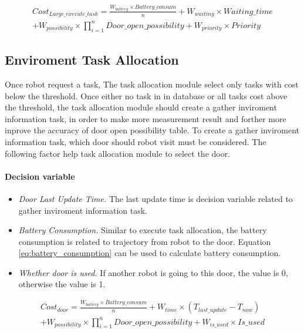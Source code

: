 \begin{equation}
	\label{eq:large_execute_task_cost}
	\begin{split}
	Cost_{Large\_execute\_task} = \frac{W_{battery} \times Battery\_consum}{n} + W_{waiting} \times Waiting\_time \\
	+ W_{possibility} \times \prod\limits_{i=1}^n Door\_open\_possibility  + W_{priority} \times Priority
	\end{split}
\end{equation}


\subsection{Enviroment Task Allocation}
Once robot request a task, The task allocation module select only tasks with cost below the threshold. Once either no task in in database or all tasks cost above the threshold, 
the task allocation module should create a gather inviroment information task, in order to make more measurement result and forther more inprove the accuracy of door open possibility table.
To create a gather inviroment information task, which door should robot visit must be considered. The following factor help task allocation module to select the door.

\paragraph*{Decision variable}
\begin{itemize}
	\item \textsl{Door Last Update Time.} The last update time is decision variable related to gather inviroment information task.
	\item \textsl{Battery Consumption.} Similar to execute task allocation, the battery consumption is related to trajectory from robot to the door. Equation \ref{eq:battery_consumption} can be used to calculate battery consumption.
	\item \textsl{Whether door is used.} If another robot is going to this door, the value is 0, otherwise the value is 1.
\end{itemize}

\begin{equation}
	\label{eq:door_cost}
	\begin{split}
	Cost_{door} = \frac{W_{battery} \times Battery\_consum}{n} + W_{time} \times (T_{last\_update} - T_{now}) \\
	+ W_{possibility} \times \prod\limits_{i=1}^n Door\_open\_possibility + W_{is\_used} \times Is\_used  
	\end{split}
\end{equation}

